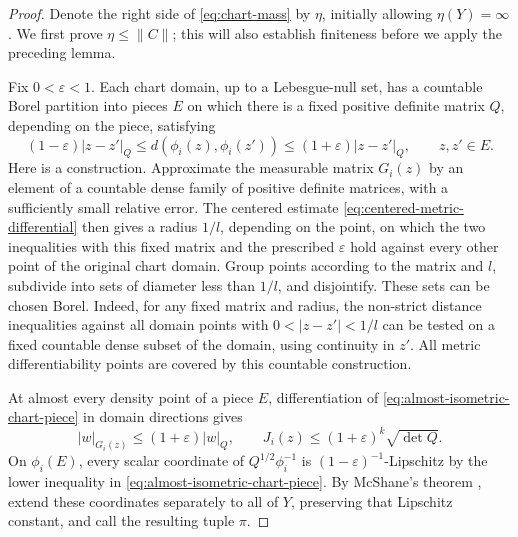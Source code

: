\documentclass[11pt]{article}
\numberwithin{equation}{section}
\theoremstyle{definition}
\theoremstyle{remark}
\begin{document}
\begin{proof}
Denote the right side of \eqref{eq:chart-mass} by \(\eta\), initially
allowing \(\eta(Y)=\infty\). We first prove \(\eta\le\|C\|\); this
will also establish finiteness before we apply the preceding lemma.

Fix \(0<\varepsilon<1\). Each chart domain, up to a Lebesgue-null set,
has a countable Borel partition into pieces \(E\) on which there is a
fixed positive definite matrix \(Q\), depending on the piece, satisfying
\begin{equation}
\label{eq:almost-isometric-chart-piece}
 (1-\varepsilon)|z-z'|_Q
 \le d(\phi_i(z),\phi_i(z'))
 \le(1+\varepsilon)|z-z'|_Q,
 \qquad z,z'\in E.
\end{equation}
Here is a construction. Approximate the measurable matrix \(G_i(z)\)
by an element of a countable dense family of positive definite matrices,
with a sufficiently small relative error. The centered estimate
\eqref{eq:centered-metric-differential} then gives a radius \(1/l\),
depending on the point, on which the two inequalities with this fixed
matrix and the prescribed \(\varepsilon\) hold against every other
point of the original chart domain. Group points according to the
matrix and \(l\), subdivide into sets of diameter less than \(1/l\),
and disjointify. These sets can be chosen Borel. Indeed, for any fixed
matrix and radius, the non-strict distance inequalities against all
domain points with \(0<|z-z'|<1/l\) can be tested on a fixed countable
dense subset of the domain, using continuity in \(z'\). All metric
differentiability points are covered by this countable construction.

At almost every density point of a piece \(E\), differentiation of
\eqref{eq:almost-isometric-chart-piece} in domain directions gives
\[
 |w|_{G_i(z)}\le(1+\varepsilon)|w|_Q,
 \qquad
 J_i(z)\le(1+\varepsilon)^k\sqrt{\det Q}.
\]
On \(\phi_i(E)\), every scalar coordinate of
\(Q^{1/2}\phi_i^{-1}\) is \((1-\varepsilon)^{-1}\)-Lipschitz by the
lower inequality in \eqref{eq:almost-isometric-chart-piece}.
By McShane's theorem \cite[Theorem~2.1]{Rieffel2006}, extend these
coordinates separately to all of \(Y\), preserving that Lipschitz
constant, and call the resulting tuple \(\pi\).


\end{proof}
\end{document}
